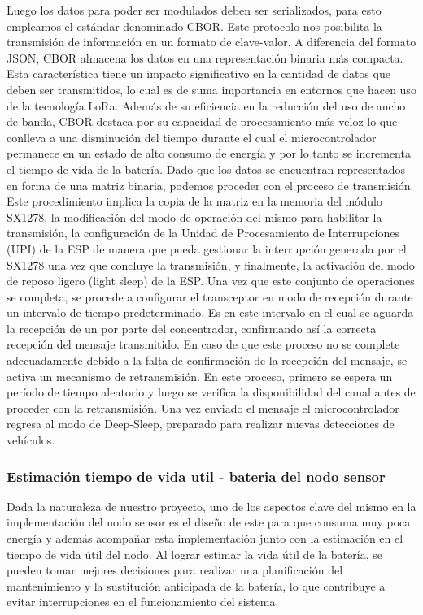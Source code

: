 Luego los datos para poder ser modulados deben ser serializados, para esto empleamos el estándar denominado CBOR. Este protocolo nos posibilita la transmisión de información en un formato de clave-valor. A diferencia del formato JSON, CBOR almacena los datos en una representación binaria más compacta. Esta característica tiene un impacto significativo en la cantidad de datos que deben ser transmitidos, lo cual es de suma importancia en entornos que hacen uso de la tecnología LoRa. Además de su eficiencia en la reducción del uso de ancho de banda, CBOR destaca por su capacidad de procesamiento más veloz lo que conlleva a una disminución del tiempo durante el cual el microcontrolador permanece en un estado de alto consumo de energía y por lo tanto se incrementa el tiempo de vida de la batería.
Dado que los datos se encuentran representados en forma de una matriz binaria, podemos proceder con el proceso de transmisión. Este procedimiento implica la copia de la matriz en la memoria del módulo SX1278, la modificación del modo de operación del mismo para habilitar la transmisión, la configuración de la Unidad de Procesamiento de Interrupciones (UPI) de la ESP de manera que pueda gestionar la interrupción generada por el SX1278 una vez que concluye la transmisión, y finalmente, la activación del modo de reposo ligero (light sleep) de la ESP. Una vez que este conjunto de operaciones se completa, se procede a configurar el transceptor en modo de recepción durante un intervalo de tiempo predeterminado. Es en este intervalo en el cual se aguarda la recepción de un  por parte del concentrador, confirmando así la correcta recepción del mensaje transmitido.
En caso de que este proceso no se complete adecuadamente debido a la falta de confirmación de la recepción del mensaje, se activa un mecanismo de retransmisión. En este proceso, primero se espera un período de tiempo aleatorio y luego se verifica la disponibilidad del canal antes de proceder con la retransmisión.
Una vez enviado el mensaje el microcontrolador regresa al modo de Deep-Sleep, preparado para realizar nuevas detecciones de vehículos.




\subsubsection{Estimación tiempo de vida util - bateria del nodo sensor}{\label{sec:bateria_del_nodo_sensor}}
Dada la naturaleza de nuestro proyecto, uno de los aspectos clave del mismo en la
implementación del nodo sensor es el diseño de este para que consuma muy poca energía y
además acompañar esta implementación junto con la estimación en el tiempo de vida útil
del nodo.
Al lograr estimar la vida útil de la batería, se pueden tomar mejores decisiones para
realizar una planificación del mantenimiento y la sustitución anticipada de la batería,
lo que contribuye a evitar interrupciones en el funcionamiento del sistema.

